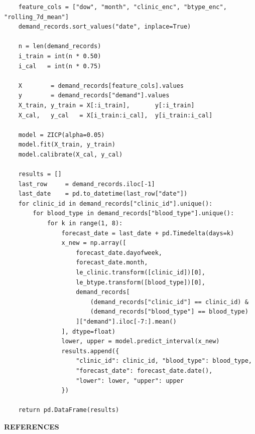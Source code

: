 \documentclass[12pt,a4paper]{article}
\begin{document}
\begin{lstlisting}
    feature_cols = ["dow", "month", "clinic_enc", "btype_enc", "rolling_7d_mean"]
    demand_records.sort_values("date", inplace=True)

    n = len(demand_records)
    i_train = int(n * 0.50)
    i_cal   = int(n * 0.75)

    X        = demand_records[feature_cols].values
    y        = demand_records["demand"].values
    X_train, y_train = X[:i_train],       y[:i_train]
    X_cal,   y_cal   = X[i_train:i_cal],  y[i_train:i_cal]

    model = ZICP(alpha=0.05)
    model.fit(X_train, y_train)
    model.calibrate(X_cal, y_cal)

    results = []
    last_row     = demand_records.iloc[-1]
    last_date    = pd.to_datetime(last_row["date"])
    for clinic_id in demand_records["clinic_id"].unique():
        for blood_type in demand_records["blood_type"].unique():
            for k in range(1, 8):
                forecast_date = last_date + pd.Timedelta(days=k)
                x_new = np.array([
                    forecast_date.dayofweek,
                    forecast_date.month,
                    le_clinic.transform([clinic_id])[0],
                    le_btype.transform([blood_type])[0],
                    demand_records[
                        (demand_records["clinic_id"] == clinic_id) &
                        (demand_records["blood_type"] == blood_type)
                    ]["demand"].iloc[-7:].mean()
                ], dtype=float)
                lower, upper = model.predict_interval(x_new)
                results.append({
                    "clinic_id": clinic_id, "blood_type": blood_type,
                    "forecast_date": forecast_date.date(),
                    "lower": lower, "upper": upper
                })

    return pd.DataFrame(results)
\end{lstlisting}

\newpage
\begin{center}
    \textbf{\large REFERENCES}
\end{center}
\vspace{1em}
\end{document}
